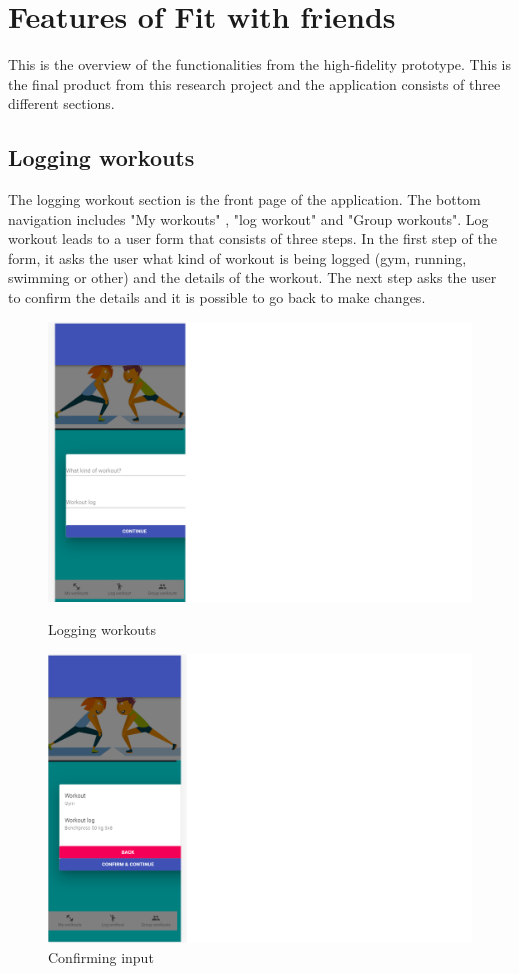 \chapter{Features of Fit with friends} \label{fitwithf}
This is the overview of the functionalities from the high-fidelity prototype. This is the final product from this research project and the application consists of three different sections.

\section{Logging workouts}
The logging workout section is the front page of the application. The bottom navigation includes "My workouts" , "log workout" and "Group workouts". Log workout leads to a user form that consists of three steps. In the first step of the form, it asks the user what kind of workout is being logged (gym, running, swimming or other) and the details of the workout. The next step asks the user to confirm the details and it is possible to go back to make changes.
\begin{figure}[H]
  \centering
  \begin{minipage}[b]{0.4\textwidth}
    \includegraphics[width=\textwidth]{figures/loggingworkouts.png}
    \caption{Logging workouts}
  \end{minipage}
  \hfill
  \begin{minipage}[b]{0.4\textwidth}
    \includegraphics[width=\textwidth]{figures/confirmworkouts.png}
    \caption{Confirming input}
  \end{minipage}
\end{figure}

